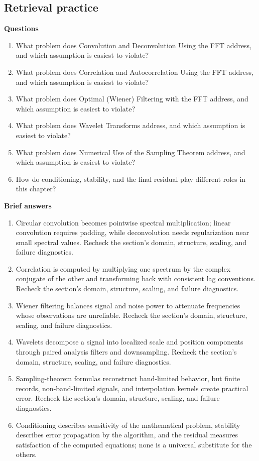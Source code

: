 \documentclass[10pt,letterpaper]{article}
\begin{document}
\subsection*{Retrieval practice}
\textbf{Questions}
\begin{enumerate}
\item What problem does Convolution and Deconvolution Using the FFT address, and which assumption is easiest to violate?
\item What problem does Correlation and Autocorrelation Using the FFT address, and which assumption is easiest to violate?
\item What problem does Optimal (Wiener) Filtering with the FFT address, and which assumption is easiest to violate?
\item What problem does Wavelet Transforms address, and which assumption is easiest to violate?
\item What problem does Numerical Use of the Sampling Theorem address, and which assumption is easiest to violate?
\item How do conditioning, stability, and the final residual play different roles in this chapter?
\end{enumerate}

\textbf{Brief answers}
\begin{enumerate}
\item Circular convolution becomes pointwise spectral multiplication; linear convolution requires padding, while deconvolution needs regularization near small spectral values. Recheck the section's domain, structure, scaling, and failure diagnostics.
\item Correlation is computed by multiplying one spectrum by the complex conjugate of the other and transforming back with consistent lag conventions. Recheck the section's domain, structure, scaling, and failure diagnostics.
\item Wiener filtering balances signal and noise power to attenuate frequencies whose observations are unreliable. Recheck the section's domain, structure, scaling, and failure diagnostics.
\item Wavelets decompose a signal into localized scale and position components through paired analysis filters and downsampling. Recheck the section's domain, structure, scaling, and failure diagnostics.
\item Sampling-theorem formulas reconstruct band-limited behavior, but finite records, non-band-limited signals, and interpolation kernels create practical error. Recheck the section's domain, structure, scaling, and failure diagnostics.
\item Conditioning describes sensitivity of the mathematical problem, stability describes error propagation by the algorithm, and the residual measures satisfaction of the computed equations; none is a universal substitute for the others.
\end{enumerate}
\end{document}
